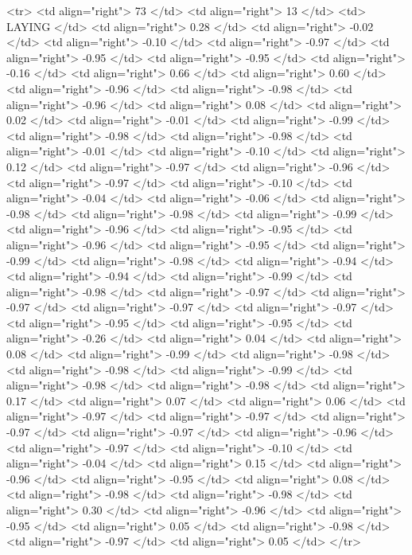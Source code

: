   <tr> <td align="right"> 73 </td> <td align="right">  13 </td> <td> LAYING </td> <td align="right"> 0.28 </td> <td align="right"> -0.02 </td> <td align="right"> -0.10 </td> <td align="right"> -0.97 </td> <td align="right"> -0.95 </td> <td align="right"> -0.95 </td> <td align="right"> -0.16 </td> <td align="right"> 0.66 </td> <td align="right"> 0.60 </td> <td align="right"> -0.96 </td> <td align="right"> -0.98 </td> <td align="right"> -0.96 </td> <td align="right"> 0.08 </td> <td align="right"> 0.02 </td> <td align="right"> -0.01 </td> <td align="right"> -0.99 </td> <td align="right"> -0.98 </td> <td align="right"> -0.98 </td> <td align="right"> -0.01 </td> <td align="right"> -0.10 </td> <td align="right"> 0.12 </td> <td align="right"> -0.97 </td> <td align="right"> -0.96 </td> <td align="right"> -0.97 </td> <td align="right"> -0.10 </td> <td align="right"> -0.04 </td> <td align="right"> -0.06 </td> <td align="right"> -0.98 </td> <td align="right"> -0.98 </td> <td align="right"> -0.99 </td> <td align="right"> -0.96 </td> <td align="right"> -0.95 </td> <td align="right"> -0.96 </td> <td align="right"> -0.95 </td> <td align="right"> -0.99 </td> <td align="right"> -0.98 </td> <td align="right"> -0.94 </td> <td align="right"> -0.94 </td> <td align="right"> -0.99 </td> <td align="right"> -0.98 </td> <td align="right"> -0.97 </td> <td align="right"> -0.97 </td> <td align="right"> -0.97 </td> <td align="right"> -0.97 </td> <td align="right"> -0.95 </td> <td align="right"> -0.95 </td> <td align="right"> -0.26 </td> <td align="right"> 0.04 </td> <td align="right"> 0.08 </td> <td align="right"> -0.99 </td> <td align="right"> -0.98 </td> <td align="right"> -0.98 </td> <td align="right"> -0.99 </td> <td align="right"> -0.98 </td> <td align="right"> -0.98 </td> <td align="right"> 0.17 </td> <td align="right"> 0.07 </td> <td align="right"> 0.06 </td> <td align="right"> -0.97 </td> <td align="right"> -0.97 </td> <td align="right"> -0.97 </td> <td align="right"> -0.97 </td> <td align="right"> -0.96 </td> <td align="right"> -0.97 </td> <td align="right"> -0.10 </td> <td align="right"> -0.04 </td> <td align="right"> 0.15 </td> <td align="right"> -0.96 </td> <td align="right"> -0.95 </td> <td align="right"> 0.08 </td> <td align="right"> -0.98 </td> <td align="right"> -0.98 </td> <td align="right"> 0.30 </td> <td align="right"> -0.96 </td> <td align="right"> -0.95 </td> <td align="right"> 0.05 </td> <td align="right"> -0.98 </td> <td align="right"> -0.97 </td> <td align="right"> 0.05 </td> </tr>
